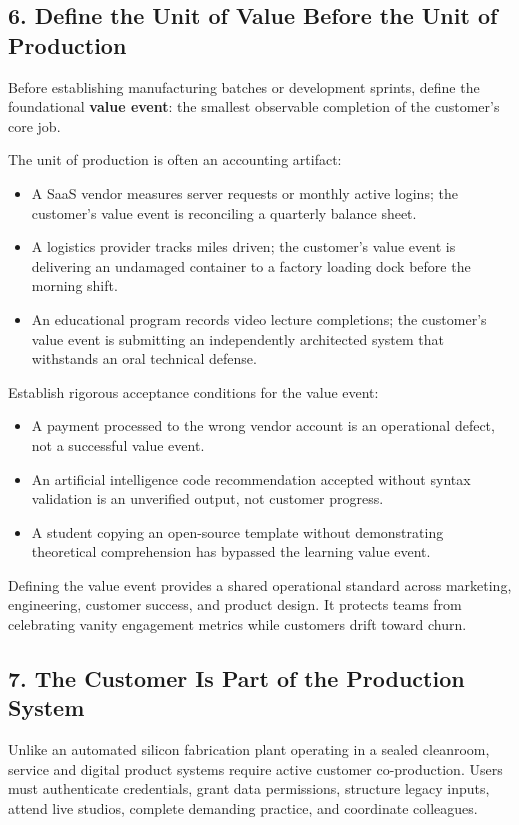 \subsection*{6. Define the Unit of Value Before the Unit of Production}

Before establishing manufacturing batches or development sprints, define the foundational \textbf{value event}: the smallest observable completion of the customer's core job.

The unit of production is often an accounting artifact:
\begin{itemize}
    \item A SaaS vendor measures server requests or monthly active logins; the customer's value event is reconciling a quarterly balance sheet.
    \item A logistics provider tracks miles driven; the customer's value event is delivering an undamaged container to a factory loading dock before the morning shift.
    \item An educational program records video lecture completions; the customer's value event is submitting an independently architected system that withstands an oral technical defense.
\end{itemize}

Establish rigorous acceptance conditions for the value event:
\begin{itemize}
    \item A payment processed to the wrong vendor account is an operational defect, not a successful value event.
    \item An artificial intelligence code recommendation accepted without syntax validation is an unverified output, not customer progress.
    \item A student copying an open-source template without demonstrating theoretical comprehension has bypassed the learning value event.
\end{itemize}

Defining the value event provides a shared operational standard across marketing, engineering, customer success, and product design. It protects teams from celebrating vanity engagement metrics while customers drift toward churn.

\subsection*{7. The Customer Is Part of the Production System}

Unlike an automated silicon fabrication plant operating in a sealed cleanroom, service and digital product systems require active customer co-production. Users must authenticate credentials, grant data permissions, structure legacy inputs, attend live studios, complete demanding practice, and coordinate colleagues.


